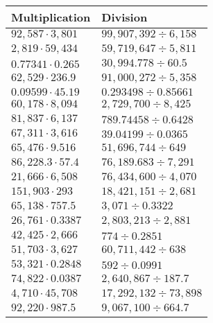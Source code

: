 \begin{longtable}[]{@{}ll@{}}
\toprule
Multiplication & Division\tabularnewline
\midrule
\endhead
\(92,587\cdot3,801\) & \(99,907,392÷6,158\)\tabularnewline
\(2,819\cdot59,434\) & \(59,719,647÷5,811\)\tabularnewline
\(0.77341\cdot0.265\) & \(30,994.778÷60.5\)\tabularnewline
\(62,529\cdot 236.9\) & \(91,000,272÷5,358\)\tabularnewline
\(0.09599\cdot45.19\) & \(0.293498÷0.85661\)\tabularnewline
\(60,178\cdot8,094\) & \(2,729,700÷8,425\)\tabularnewline
\(81,837\cdot6,137\) & \(789.74458÷0.6428\)\tabularnewline
\(67,311\cdot3,616\) & \(39.04199÷0.0365\)\tabularnewline
\(65,476\cdot9.516\) & \(51,696,744÷649\)\tabularnewline
\(86,228.3\cdot57.4\) & \(76,189.683÷7,291\)\tabularnewline
\(21,666\cdot6,508\) & \(76,434,600÷4,070\)\tabularnewline
\(151,903\cdot293\) & \(18,421,151÷2,681\)\tabularnewline
\(65,138\cdot757.5\) & \(3,071÷0.3322\)\tabularnewline
\(26,761\cdot0.3387\) & \(2,803,213÷2,881\)\tabularnewline
\(42,425\cdot2,666\) & \(774÷0.2851\)\tabularnewline
\(51,703\cdot3,627\) & \(60,711,442÷638\)\tabularnewline
\(53,321\cdot 0.2848\) & \(592÷0.0991\)\tabularnewline
\(74,822\cdot0.0387\) & \(2,640,867÷187.7\)\tabularnewline
\(4,710\cdot45,708\) & \(17,292,132÷73,898\)\tabularnewline
\(92,220\cdot 987.5\) & \(9,067,100÷664.7\)\tabularnewline
\bottomrule
\end{longtable}
